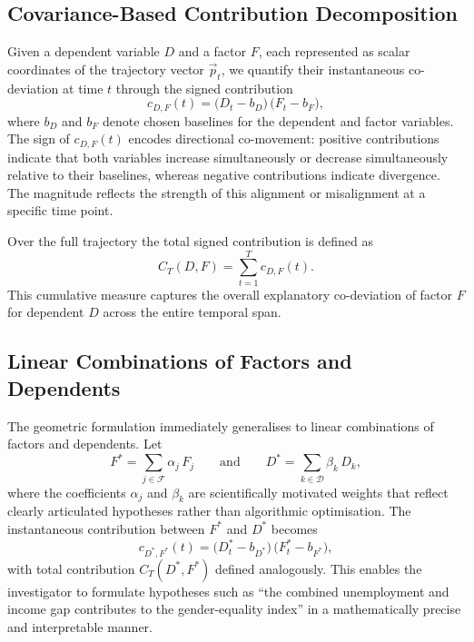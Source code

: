     \subsection{Covariance-Based Contribution Decomposition}

        Given a dependent variable $D$ and a factor $F$, each represented as scalar coordinates of the trajectory vector $\vec{p}_t$, we quantify their instantaneous co-deviation at time $t$ through the signed contribution
        \[
            c_{D,F}(t) = \big(D_t - b_D\big)\,\big(F_t - b_F\big),
        \]
        where $b_D$ and $b_F$ denote chosen baselines for the dependent and factor variables. The sign of $c_{D,F}(t)$ encodes directional co-movement: positive contributions indicate that both variables increase simultaneously or decrease simultaneously relative to their baselines, whereas negative contributions indicate divergence. The magnitude reflects the strength of this alignment or misalignment at a specific time point.

        Over the full trajectory the total signed contribution is defined as
        \[
            C_T(D,F) = \sum_{t=1}^{T} c_{D,F}(t).
        \]
        This cumulative measure captures the overall explanatory co-deviation of factor $F$ for dependent $D$ across the entire temporal span.

    \subsection{Linear Combinations of Factors and Dependents}

        The geometric formulation immediately generalises to linear combinations of factors and dependents. Let
        \[
            F^{\ast} = \sum_{j \in \mathcal{F}} \alpha_j\,F_j
            \qquad\text{and}\qquad
            D^{\ast} = \sum_{k \in \mathcal{D}} \beta_k\,D_k,
        \]
        where the coefficients $\alpha_j$ and $\beta_k$ are scientifically motivated weights that reflect clearly articulated hypotheses rather than algorithmic optimisation. The instantaneous contribution between $F^{\ast}$ and $D^{\ast}$ becomes
        \[
            c_{D^{\ast},F^{\ast}}(t)
              = \big(D^{\ast}_t - b_{D^{\ast}}\big)\,\big(F^{\ast}_t - b_{F^{\ast}}\big),
        \]
        with total contribution $C_T(D^{\ast},F^{\ast})$ defined analogously. This enables the investigator to formulate hypotheses such as ``the combined unemployment and income gap contributes to the gender-equality index'' in a mathematically precise and interpretable manner.


